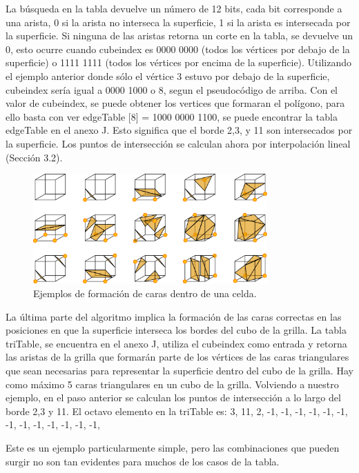 \documentclass[12pt]{article}
\begin{document}
La búsqueda en la tabla devuelve un número de 12 bits, cada bit corresponde a una arista, 0 si la arista no interseca la superficie, 1 si la arista es intersecada por la superficie. Si ninguna de las aristas retorna un corte en la tabla, se devuelve un 0, esto ocurre cuando cubeindex es 0000 0000 (todos los vértices por debajo de la superficie) o 1111 1111 (todos los vértices por encima de la superficie).
Utilizando el ejemplo anterior donde sólo el vértice 3 estuvo por debajo de la superficie, cubeindex sería igual a 0000 1000 o 8, segun el pseudocódigo de arriba. Con el valor de cubeindex, se puede obtener los vertices que formaran el polígono, para ello basta con ver edgeTable [8] = 1000 0000 1100, se puede encontrar la tabla edgeTable en el anexo J. Esto significa que el borde 2,3, y 11 son intersecados por la superficie. Los puntos de intersección se calculan ahora por interpolación lineal (Sección 3.2).

\begin{figure}[h!]
\includegraphics[width=0.8\textwidth,center]{marchingcubes3.png}
\caption{Ejemplos de formación de caras dentro de una celda.}
\end{figure}

La última parte del algoritmo implica la formación de las caras correctas en las posiciones en que la superficie interseca los bordes del cubo de la grilla. La tabla triTable, se encuentra en el anexo J, utiliza el cubeindex como entrada y retorna las aristas de la grilla que  formarán parte de los vértices de las caras triangulares que sean necesarias para representar la superficie dentro del cubo de la grilla. Hay como máximo 5 caras triangulares en un cubo de la grilla.
Volviendo a nuestro ejemplo, en el paso anterior se calculan los puntos de intersección a lo largo del borde 2,3 y 11. El octavo elemento en la triTable es:
{3, 11, 2, -1, -1, -1, -1, -1, -1, -1, -1, -1, -1, -1, -1, -1},

Este es un ejemplo particularmente simple, pero las combinaciones que pueden surgir no son tan evidentes para muchos de los casos de la tabla.
\end{document}
